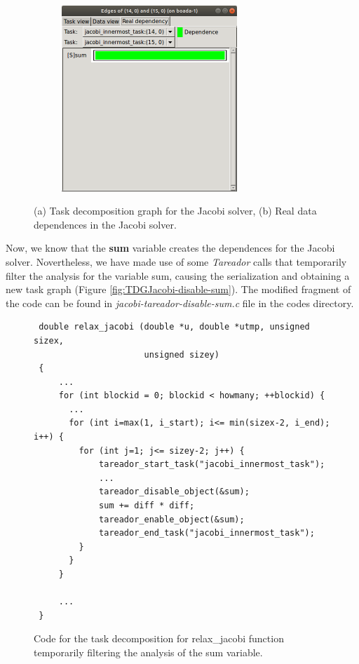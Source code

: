 \documentclass[12pt, a4paper]{article}
\begin{document}
\begin{figure}[H]
\begin{subfigure}{0.45\textwidth}
\caption{\label{fig:TDGJacobi}}
\end{subfigure}
\begin{subfigure}{0.45\textwidth}
\centering
\includegraphics[scale=0.55,height=7cm]{./images/dependence-jacobi}
\caption{\label{fig:RealDependencyJacobi}}
\end{subfigure}
\caption{(a) Task decomposition graph for the Jacobi solver, (b) Real data dependences in the Jacobi solver.}
\end{figure}

Now, we know that the \textbf{sum} variable creates the dependences for the Jacobi solver. Novertheless, we have made use of some \textit{Tareador} calls that temporarily filter the analysis for the variable sum, causing the serialization and obtaining a new task graph (Figure \ref{fig:TDGJacobi-disable-sum}). The modified fragment of the code can be found in \textit{jacobi-tareador-disable-sum.c} file in the codes directory.

\begin{figure}[H]
\begin{lstlisting}
 double relax_jacobi (double *u, double *utmp, unsigned sizex,
 					  unsigned sizey)
 {
 	 ...
     for (int blockid = 0; blockid < howmany; ++blockid) {
       ...
       for (int i=max(1, i_start); i<= min(sizex-2, i_end); i++) {
         for (int j=1; j<= sizey-2; j++) {
			 tareador_start_task("jacobi_innermost_task");
			 ...
			 tareador_disable_object(&sum);
			 sum += diff * diff;
			 tareador_enable_object(&sum);
			 tareador_end_task("jacobi_innermost_task");
	 	 }
       }
     }

     ...
 }
\end{lstlisting}
\label{code:tareador-relax-jacobi-disable-sum}
\caption{Code for the task decomposition for relax\_jacobi function temporarily filtering the analysis of the sum variable.}
\end{figure}
\end{document}
